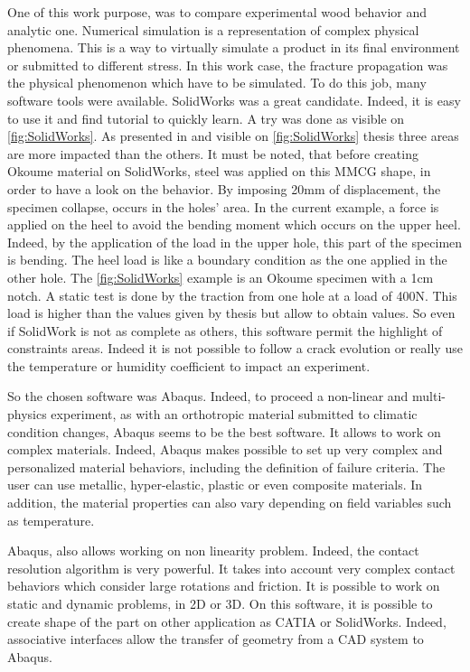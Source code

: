 One of this work purpose, was to compare experimental wood behavior and analytic one.
Numerical simulation is a representation of complex physical phenomena. This is a way to virtually simulate a product in its final environment or submitted to different stress. In this work case, the fracture propagation was the physical phenomenon which have to be simulated. To do this job, many software tools were available. SolidWorks was a great candidate. Indeed, it is easy to use it and find tutorial to quickly learn. A try was done as visible on \ref{fig:SolidWorks}. As presented in \parencite{Reference8} and visible on \ref{fig:SolidWorks} thesis three areas are more impacted than the others. It must be noted, that before creating Okoume material on SolidWorks, steel was applied on this MMCG shape, in order to have a look on the behavior. By imposing 20\si{\milli\meter} of displacement, the specimen collapse, occurs in the holes' area. In the current example, a force is applied on the heel to avoid the bending moment which occurs on the upper heel. Indeed, by the application of the load in the upper hole, this part of the specimen is bending. The heel load is like a boundary condition as the one applied in the other hole. The \ref{fig:SolidWorks} example is an Okoume specimen with a 1\si{\centi\meter} notch. A static test is done by the traction from one hole at a load of 400\si{\newton}. This load is higher than the values given by \parencite{Reference7} thesis but allow to obtain values. So even if SolidWork is not as complete as others, this software permit the highlight of constraints areas. Indeed it is not possible to follow a crack evolution or really use the temperature or humidity coefficient to impact an experiment.

So the chosen software was Abaqus.
Indeed, to proceed a non-linear and multi-physics experiment, as with an orthotropic material submitted to climatic condition changes, Abaqus seems to be the best software. It allows to work on complex materials. Indeed, Abaqus makes possible to set up very complex and personalized material behaviors, including the definition of failure criteria. The user can use metallic, hyper-elastic, plastic or even composite materials. In addition, the material properties can also vary depending on field variables such as temperature.

Abaqus, also allows working on non linearity problem. Indeed, the contact resolution algorithm is very powerful. It takes into account very complex contact behaviors which consider large rotations and friction.  It is possible to work on static and dynamic problems, in 2D or 3D.
On this software, it is possible to create shape of the part on other application as CATIA or SolidWorks. Indeed, associative interfaces allow the transfer of geometry from a CAD system to Abaqus.

